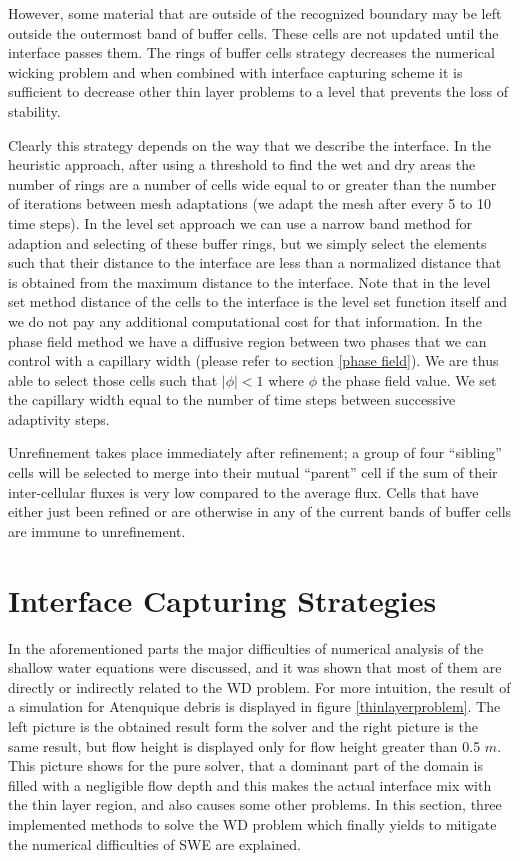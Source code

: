 \documentclass[letterpaper,10pt]{article}
\begin{document}
However, some material that are outside of the recognized boundary may be left outside the outermost band of buffer cells. These cells are not updated until the interface passes them.
The rings of buffer cells strategy decreases the numerical wicking problem and when combined with interface capturing scheme it is sufficient to decrease other thin layer problems to a level that 
prevents the loss of stability.

Clearly this strategy depends on the way that we describe the interface. In the heuristic approach, after using a threshold to find the wet and dry areas the number of rings are a number of cells wide 
equal to or greater than the number of iterations between mesh adaptations (we adapt the mesh after every 5 to 10 time steps). In the level set approach we can use a narrow band method for adaption 
and selecting of these buffer rings, but we simply select the elements such that their distance to the interface are less than a normalized distance that is obtained from the maximum distance 
to the interface. Note that in the level set method distance of the cells to the interface is the level set function itself and we do not pay any additional computational cost for that information. 
In the phase field method we have a diffusive region between two phases that we can control with a capillary width (please refer to section \ref{phase field}).
We are thus able to select those cells such that $|\phi| <1 $ where $\phi$ the phase field value. We set the capillary width equal to the number of time steps between successive adaptivity steps.

Unrefinement takes place immediately after refinement; a group of four ``sibling'' cells will be selected to merge into their mutual ``parent'' cell if the sum of their inter-cellular fluxes is very 
low compared to the average flux.  Cells that have either just been refined or are otherwise in any of the current bands of buffer cells are immune 
to unrefinement.  
    

\section{Interface Capturing Strategies}\label{solution}
In the aforementioned parts the major difficulties of numerical analysis of the shallow water
equations were discussed, and it was shown that most of them are directly or indirectly related to the WD problem.
For more intuition, the result of a simulation for Atenquique debris is displayed in figure \ref{thinlayerproblem}. 
The left picture is the obtained result form the solver and the right picture is the same result, but flow height is displayed 
only for flow height greater than 0.5 $m$. This picture shows for the pure solver, that a dominant part of the 
domain is filled with a negligible flow depth and this makes the actual interface mix with the thin layer region, and 
also causes some other problems. In this section, three implemented methods to solve the WD problem which finally yields to 
mitigate the numerical difficulties of SWE are explained. 
\end{document}
